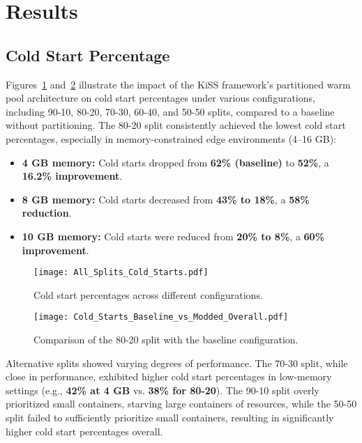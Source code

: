 \section{Results}\label{sec:results}


\subsection{Cold Start Percentage}

Figures~\ref{fig:cold_start_1} and~\ref{fig:cold_start_2} illustrate the impact of the KiSS framework's partitioned warm pool architecture on cold start percentages under various configurations, including 90-10, 80-20, 70-30, 60-40, and 50-50 splits, compared to a baseline without partitioning. The 80-20 split consistently achieved the lowest cold start percentages, especially in memory-constrained edge environments (4–16 GB):
\begin{itemize}
    \item \textbf{4 GB memory:} Cold starts dropped from \textbf{62\% (baseline)} to \textbf{52\%}, a \textbf{16.2\% improvement}.
    \item \textbf{8 GB memory:} Cold starts decreased from \textbf{43\% to 18\%}, a \textbf{58\% reduction}.
    \item \textbf{10 GB memory:} Cold starts were reduced from \textbf{20\% to 8\%}, a \textbf{60\% improvement}.
\end{itemize}

\begin{figure}[h]
    \centering
    \texttt{[image: All\_Splits\_Cold\_Starts.pdf]}
    \caption{Cold start percentages across different configurations.}
    \label{fig:cold_start_1}
\end{figure}

\begin{figure}[h]
    \centering
    \texttt{[image: Cold\_Starts\_Baseline\_vs\_Modded\_Overall.pdf]}
    \caption{Comparison of the 80-20 split with the baseline configuration.}
    \label{fig:cold_start_2}
\end{figure}

Alternative splits showed varying degrees of performance. The 70-30 split, while close in performance, exhibited higher cold start percentages in low-memory settings (e.g., \textbf{42\% at 4 GB} vs. \textbf{38\% for 80-20}). The 90-10 split overly prioritized small containers, starving large containers of resources, while the 50-50 split failed to sufficiently prioritize small containers, resulting in significantly higher cold start percentages overall.


